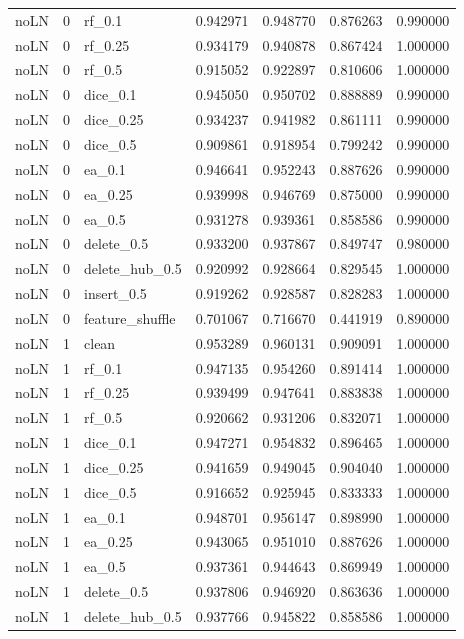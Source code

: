 \documentclass[UTF8,a4paper,11pt,fontset=fandol]{ctexart}
\begin{document}
{\begin{longtable}{lrlrrrr}
noLN & 0 & rf\_0.1 & 0.942971 & 0.948770 & 0.876263 & 0.990000 \\
noLN & 0 & rf\_0.25 & 0.934179 & 0.940878 & 0.867424 & 1.000000 \\
noLN & 0 & rf\_0.5 & 0.915052 & 0.922897 & 0.810606 & 1.000000 \\
noLN & 0 & dice\_0.1 & 0.945050 & 0.950702 & 0.888889 & 0.990000 \\
noLN & 0 & dice\_0.25 & 0.934237 & 0.941982 & 0.861111 & 0.990000 \\
noLN & 0 & dice\_0.5 & 0.909861 & 0.918954 & 0.799242 & 0.990000 \\
noLN & 0 & ea\_0.1 & 0.946641 & 0.952243 & 0.887626 & 0.990000 \\
noLN & 0 & ea\_0.25 & 0.939998 & 0.946769 & 0.875000 & 0.990000 \\
noLN & 0 & ea\_0.5 & 0.931278 & 0.939361 & 0.858586 & 0.990000 \\
noLN & 0 & delete\_0.5 & 0.933200 & 0.937867 & 0.849747 & 0.980000 \\
noLN & 0 & delete\_hub\_0.5 & 0.920992 & 0.928664 & 0.829545 & 1.000000 \\
noLN & 0 & insert\_0.5 & 0.919262 & 0.928587 & 0.828283 & 1.000000 \\
noLN & 0 & feature\_shuffle & 0.701067 & 0.716670 & 0.441919 & 0.890000 \\
noLN & 1 & clean & 0.953289 & 0.960131 & 0.909091 & 1.000000 \\
noLN & 1 & rf\_0.1 & 0.947135 & 0.954260 & 0.891414 & 1.000000 \\
noLN & 1 & rf\_0.25 & 0.939499 & 0.947641 & 0.883838 & 1.000000 \\
noLN & 1 & rf\_0.5 & 0.920662 & 0.931206 & 0.832071 & 1.000000 \\
noLN & 1 & dice\_0.1 & 0.947271 & 0.954832 & 0.896465 & 1.000000 \\
noLN & 1 & dice\_0.25 & 0.941659 & 0.949045 & 0.904040 & 1.000000 \\
noLN & 1 & dice\_0.5 & 0.916652 & 0.925945 & 0.833333 & 1.000000 \\
noLN & 1 & ea\_0.1 & 0.948701 & 0.956147 & 0.898990 & 1.000000 \\
noLN & 1 & ea\_0.25 & 0.943065 & 0.951010 & 0.887626 & 1.000000 \\
noLN & 1 & ea\_0.5 & 0.937361 & 0.944643 & 0.869949 & 1.000000 \\
noLN & 1 & delete\_0.5 & 0.937806 & 0.946920 & 0.863636 & 1.000000 \\
noLN & 1 & delete\_hub\_0.5 & 0.937766 & 0.945822 & 0.858586 & 1.000000 \\

\end{longtable}}
\end{document}

